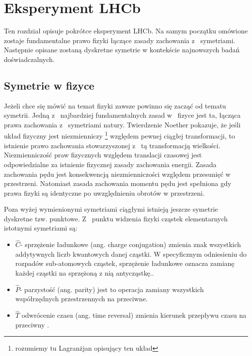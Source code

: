 \chapter{Eksperyment LHCb}

Ten rozdział opisuje pokrótce eksperyment LHCb. Na samym początku omówione zostaje fundamentalne prawo fizyki łączące zasady zachowania z~ symetriami. Następnie opisane zostaną dyskretne symetrie w kontekście najnowszych badań doświadczalnych.   

\section{Symetrie w fizyce}
Jeżeli chce się mówić na temat fizyki zawsze powinno się zacząć od tematu symetrii. Jedną z~ najbardziej fundamentalnych zasad w~ fizyce jest ta, łącząca prawa zachowania z~ symetriami natury. Twierdzenie Noether \cite{Noether} pokazuje, że jeśli układ fizyczny jest niezmienniczy \footnote{rozumiemy tu Lagranżjan opisujący ten układ} względem pewnej ciągłej transformacji, to istnienie prawo zachowania stowarzyszonej z~ tą transformacją wielkości. Niezmienniczość praw fizycznych względem translacji czasowej jest odpowiedzialne za istnienie fizycznej zasady zachowania energii. Zasada zachowania pędu jest konsekwencją niezmienniczości względem przesunięć w przestrzeni. Natomiast zasada zachowania momentu pędu jest spełniona gdy prawa fizyki są identyczne po uwzględnieniu obrotów w przestrzeni. 

Poza wyżej wymienionymi symetriami ciągłymi istnieją jeszcze symetrie dyskretne tzw. punktowe. Z~ punktu widzenia fizyki cząstek elementarnych istotnymi symetriami są:

\begin{itemize}
\item \textbf{$\hat{C}$}- sprzężenie ładunkowe (ang. charge conjugation) zmienia znak wszystkich addytywnych liczb kwantowych danej cząstki. W specyficznym odniesieniu do rozpadów sub-atomowych cząstek, sprzężenie ładunkowe oznacza zamianę każdej cząstki na sprzężoną z nią antycząstkę.\cite{symmetry}.
\item \textbf{$\hat{P}$}- parzystość (ang. parity) jest to operacja zamiany wszystkich współrzędnych przestrzennych na przeciwne. \cite{symmetry}
\item \textbf{$\hat{T}$} odwrócenie czasu (ang. time reversal) zmienia kierunek przepływu czasu na przeciwny \cite{symmetry}.
\end{itemize}

